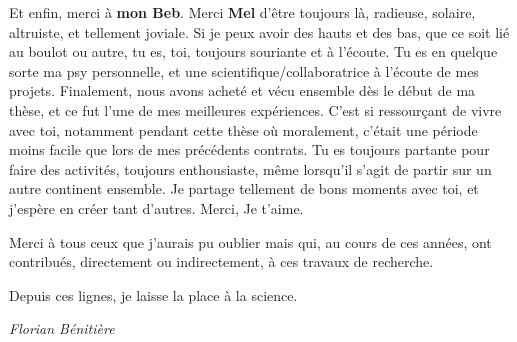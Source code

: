 \newpage
Et enfin, merci à \textbf{mon Beb}. Merci \textbf{Mel} d'être toujours là, radieuse, solaire, altruiste, et tellement joviale. Si je peux avoir des hauts et des bas, que ce soit lié au boulot ou autre, tu es, toi, toujours souriante et à l'écoute. Tu es en quelque sorte ma psy personnelle, et une scientifique/collaboratrice à l'écoute de mes projets. Finalement, nous avons acheté et vécu ensemble dès le début de ma thèse, et ce fut l'une de mes meilleures expériences. C'est si ressourçant de vivre avec toi, notamment pendant cette thèse où moralement, c'était une période moins facile que lors de mes précédents contrats. Tu es toujours partante pour faire des activités, toujours enthousiaste, même lorsqu'il s'agit de partir sur un autre continent ensemble. Je partage tellement de bons moments avec toi, et j'espère en créer tant d'autres. Merci, Je t'aime.

\vspace*{5pt}
Merci à tous ceux que j'aurais pu oublier mais qui, au cours de ces années, ont contribués, directement ou indirectement, à ces travaux de recherche.

\vspace*{10pt}
Depuis ces lignes, je laisse la  place à la science.


\begin{flushright}
    \textit{Florian Bénitière}
\end{flushright}